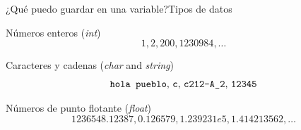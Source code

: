 \documentclass[spanish]{beamer}
\begin{document}
\begin{frame}{¿Qué puedo guardar en una variable?}{Tipos de datos}

    \begin{exampleblock}{Números enteros (\textit{int})}
        $$1, 2, 200, 1230984, \dots$$
    \end{exampleblock} \pause

    \begin{block}{Caracteres y cadenas (\textit{char} and \textit{string})}
        $$\text{\texttt{hola pueblo}, \texttt{c}, \texttt{c212-A\_2}, \texttt{12345}}$$
    \end{block} \pause

    \begin{alertblock}{Números de punto flotante (\textit{float})}
        $$1236548.12387, 0.126579, 1.239231e5, 1.414213562, \dots$$
    \end{alertblock}

\end{frame}



\end{document}

